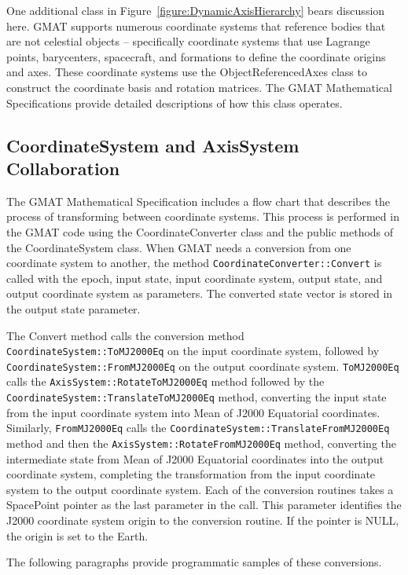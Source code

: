 One additional class in Figure~\ref{figure:DynamicAxisHierarchy} bears discussion here. GMAT
supports numerous coordinate systems that reference bodies that are not celestial objects --
specifically coordinate systems that use Lagrange points, barycenters, spacecraft, and formations to
define the coordinate origins and axes. These coordinate systems use the ObjectReferencedAxes class
to construct the coordinate basis and rotation matrices. The GMAT Mathematical
Specifications\cite{mathSpec} provide detailed descriptions of how this class operates.

\subsection{CoordinateSystem and AxisSystem Collaboration}

The GMAT Mathematical Specification\cite{mathSpec} includes a flow chart that describes the
process of transforming between coordinate systems. This process is performed in the GMAT code using
the CoordinateConverter class and the public methods of the CoordinateSystem class. When GMAT needs
a conversion from one coordinate system to another, the method \texttt{CoordinateConverter::Convert}
is called with the epoch, input state, input coordinate system, output state, and output coordinate
system as parameters. The converted state vector is stored in the output state parameter.

The Convert method calls the conversion method \texttt{CoordinateSystem::ToMJ2000Eq} on the input
coordinate system, followed by \texttt{CoordinateSystem::FromMJ2000Eq} on the output coordinate
system. \texttt{ToMJ2000Eq} calls the \texttt{AxisSystem::RotateToMJ2000Eq} method followed by the
\texttt{Coordinate\-System::TranslateToMJ2000Eq} method, converting the input state from the input
coordinate system into Mean of J2000 Equatorial coordinates. Similarly, \texttt{FromMJ2000Eq} calls
the \texttt{Coordinate\-System::TranslateFromMJ2000Eq} method and then the
\texttt{AxisSystem::RotateFromMJ2000Eq} method, converting the intermediate state from Mean of J2000
Equatorial coordinates into the output coordinate system, completing the transformation from the
input coordinate system to the output coordinate system. Each of the conversion routines takes a
SpacePoint pointer as the last parameter in the call. This parameter identifies the J2000 coordinate
system origin to the conversion routine. If the pointer is NULL, the origin is set to the Earth.

The following paragraphs provide programmatic samples of these conversions.

